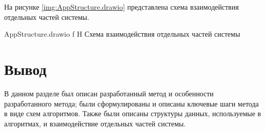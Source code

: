На рисунке \ref{img:AppStructure.drawio} представлена схема взаимодействия отдельных частей системы.

{AppStructure.drawio}
{f}
{H}
{\textwidth}
{Схема взаимодействия отдельных частей системы}

\section*{Вывод}

В данном разделе был описан разработанный метод и особенности разработанного метода; были сформулированы и описаны ключевые шаги метода в виде схем алгоритмов. Также были описаны структуры данных, используемые в алгоритмах, и взаимодействие отдельных частей системы.